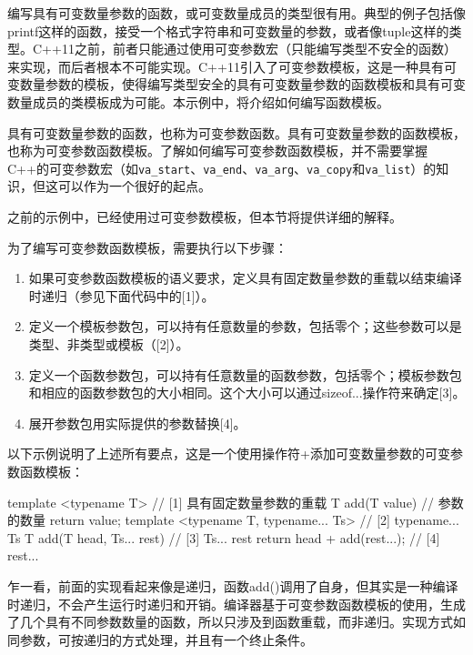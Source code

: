 编写具有可变数量参数的函数，或可变数量成员的类型很有用。典型的例子包括像printf这样的函数，接受一个格式字符串和可变数量的参数，或者像tuple这样的类型。C++11之前，前者只能通过使用可变参数宏（只能编写类型不安全的函数）来实现，而后者根本不可能实现。C++11引入了可变参数模板，这是一种具有可变数量参数的模板，使得编写类型安全的具有可变数量参数的函数模板和具有可变数量成员的类模板成为可能。本示例中，将介绍如何编写函数模板。


具有可变数量参数的函数，也称为可变参数函数。具有可变数量参数的函数模板，也称为可变参数函数模板。了解如何编写可变参数函数模板，并不需要掌握C++的可变参数宏（如\verb|va_start|、\verb|va_end|、\verb|va_arg|、\verb|va_copy|和\verb|va_list|）的知识，但这可以作为一个很好的起点。

之前的示例中，已经使用过可变参数模板，但本节将提供详细的解释。


为了编写可变参数函数模板，需要执行以下步骤：

\begin{enumerate}
\item
如果可变参数函数模板的语义要求，定义具有固定数量参数的重载以结束编译时递归（参见下面代码中的[1]）。

\item
定义一个模板参数包，可以持有任意数量的参数，包括零个；这些参数可以是类型、非类型或模板（[2]）。

\item
定义一个函数参数包，可以持有任意数量的函数参数，包括零个；模板参数包和相应的函数参数包的大小相同。这个大小可以通过sizeof...操作符来确定[3]。

\item
展开参数包用实际提供的参数替换[4]。
\end{enumerate}

以下示例说明了上述所有要点，这是一个使用操作符+添加可变数量参数的可变参数函数模板：

\begin{cpp}
template <typename T>                 // [1] 具有固定数量参数的重载
T add(T value) //     参数的数量
{
    return value;
}
template <typename T, typename... Ts> // [2] typename... Ts
T add(T head, Ts... rest) // [3] Ts... rest
{
    return head + add(rest...);         // [4] rest...
}
\end{cpp}


乍一看，前面的实现看起来像是递归，函数add()调用了自身，但其实是一种编译时递归，不会产生运行时递归和开销。编译器基于可变参数函数模板的使用，生成了几个具有不同参数数量的函数，所以只涉及到函数重载，而非递归。实现方式如同参数，可按递归的方式处理，并且有一个终止条件。

